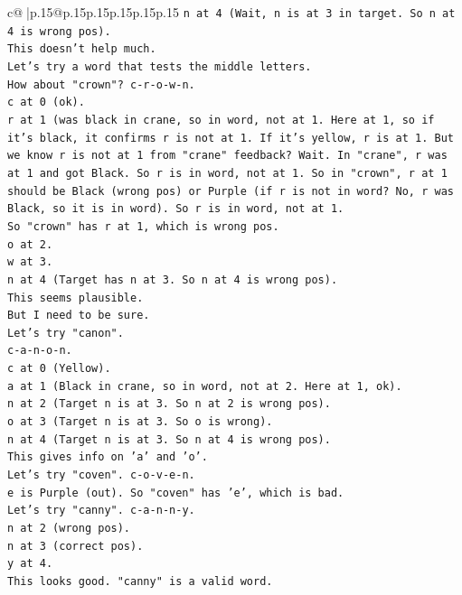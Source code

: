 \documentclass{article}
\begin{document}
{\begin{supertabular}{c@{$\;$}|p{.15\linewidth}@{}p{.15\linewidth}p{.15\linewidth}p{.15\linewidth}p{.15\linewidth}p{.15\linewidth}}
{{{\texttt{n at 4 (Wait, n is at 3 in target. So n at 4 is wrong pos).} \\
\texttt{This doesn't help much.} \\
\texttt{Let's try a word that tests the middle letters.} \\
\texttt{How about "crown"? c{-}r{-}o{-}w{-}n.} \\
\texttt{c at 0 (ok).} \\
\texttt{r at 1 (was black in crane, so in word, not at 1. Here at 1, so if it's black, it confirms r is not at 1. If it's yellow, r is at 1. But we know r is not at 1 from "crane" feedback? Wait. In "crane", r was at 1 and got Black. So r is in word, not at 1. So in "crown", r at 1 should be Black (wrong pos) or Purple (if r is not in word? No, r was Black, so it is in word). So r is in word, not at 1.} \\
\texttt{So "crown" has r at 1, which is wrong pos.} \\
\texttt{o at 2.} \\
\texttt{w at 3.} \\
\texttt{n at 4 (Target has n at 3. So n at 4 is wrong pos).} \\
\texttt{This seems plausible.} \\
\texttt{But I need to be sure.} \\
\texttt{Let's try "canon".} \\
\texttt{c{-}a{-}n{-}o{-}n.} \\
\texttt{c at 0 (Yellow).} \\
\texttt{a at 1 (Black in crane, so in word, not at 2. Here at 1, ok).} \\
\texttt{n at 2 (Target n is at 3. So n at 2 is wrong pos).} \\
\texttt{o at 3 (Target n is at 3. So o is wrong).} \\
\texttt{n at 4 (Target n is at 3. So n at 4 is wrong pos).} \\
\texttt{This gives info on 'a' and 'o'.} \\
\texttt{Let's try "coven". c{-}o{-}v{-}e{-}n.} \\
\texttt{e is Purple (out). So "coven" has 'e', which is bad.} \\
\texttt{Let's try "canny". c{-}a{-}n{-}n{-}y.} \\
\texttt{n at 2 (wrong pos).} \\
\texttt{n at 3 (correct pos).} \\
\texttt{y at 4.} \\
\texttt{This looks good. "canny" is a valid word.} \\
}}}
\end{supertabular}}
\end{document}
